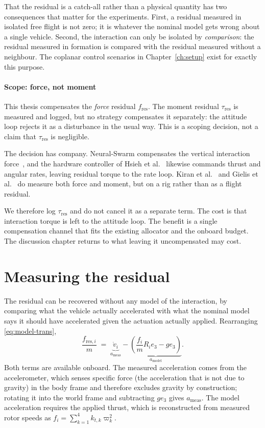 That the residual is a catch-all rather than a physical quantity has two consequences that matter
for the experiments. First, a residual measured in isolated free flight is not zero; it is whatever
the nominal model gets wrong about a single vehicle. Second, the interaction can only be isolated
by \emph{comparison}: the residual measured in formation is compared with the residual measured
without a neighbour. The coplanar control scenarios in Chapter~\ref{ch:setup} exist for exactly
this purpose.

\paragraph{Scope: force, not moment}

This thesis compensates the \emph{force} residual $f_{\mathrm{res}}$. The moment residual
$\tau_{\mathrm{res}}$ is measured and logged, but no strategy compensates it separately: the
attitude loop rejects it as a disturbance in the usual way. This is a scoping decision, not a claim
that $\tau_{\mathrm{res}}$ is negligible.

The decision has company. Neural-Swarm compensates the vertical interaction
force~\cite{shi2020neuralswarm}, and the hardware controller of Hsieh et
al.~\cite{hsieh2026flatness} likewise commands thrust and angular rates, leaving residual torque to
the rate loop. Kiran et al.~\cite{kiran2025downwash} and Gielis et al.~\cite{gielis2023aggregate}
do measure both force and moment, but on a rig rather than as a flight residual.

We therefore log $\tau_{\mathrm{res}}$ and do not cancel it as a separate term. The cost is that
interaction torque is left to the attitude loop. The benefit is a single compensation channel that
fits the existing allocator and the onboard budget. The discussion chapter returns to what leaving
it uncompensated may cost.

\section{Measuring the residual}
\label{sec:model-measure}

The residual can be recovered without any model of the interaction, by comparing what the vehicle
actually accelerated with what the nominal model says it should have accelerated given the
actuation actually applied. Rearranging \eqref{eq:model-trans},
%
\begin{equation}
  \frac{f_{\mathrm{res},i}}{m}
  \;=\; \underbrace{\dot{v}_i}_{a_{\mathrm{meas}}}
      - \underbrace{\left( \frac{f_i}{m} R_i e_3 - g e_3 \right)}_{a_{\mathrm{model}}} .
  \label{eq:model-ares}
\end{equation}
%
Both terms are available onboard. The measured acceleration comes from the accelerometer, which
senses specific force (the acceleration that is not due to gravity) in the body frame and therefore excludes gravity by construction; rotating it
into the world frame and subtracting $g e_3$ gives $a_{\mathrm{meas}}$. The model acceleration
requires the applied thrust, which is reconstructed from measured rotor speeds as
$f_i = \sum_{k=1}^{4} k_{t,k}\varpi_k^2$.

